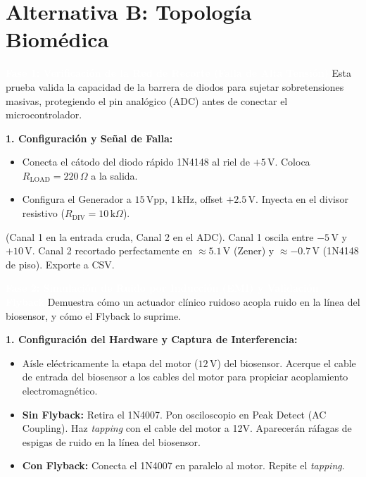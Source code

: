 \documentclass[11pt, a4paper]{article}
\newcommand{\phase}[1]{\vspace{0.4cm}\noindent\colorbox{ucbblue}{\textcolor{white}{\textbf{\large #1}}}\vspace{0.2cm}}
\newcommand{\subphase}[1]{\vspace{0.2cm}\noindent\textbf{\textcolor{ucbblue}{#1}}\vspace{0.1cm}}
\begin{document}
\newpage
\section*{\textcolor{ucborange}{Alternativa B: Topología Biomédica}}

\phase{Fase 1: Verificación de la Red de Recorte (Falla de Alta Tensión)}
Esta prueba valida la capacidad de la barrera de diodos para sujetar sobretensiones masivas, protegiendo el pin analógico (ADC) antes de conectar el microcontrolador.

\subphase{1. Configuración y Señal de Falla:}
\begin{itemize}[leftmargin=*]
    \item Conecta el cátodo del diodo rápido 1N4148 al riel de $+5\,\text{V}$. Coloca $R_{\text{LOAD}} = 220\,\Omega$ a la salida.
    \item Configura el Generador a $15\,\text{Vpp}$, $1\,\text{kHz}$, offset $+2.5\,\text{V}$. Inyecta en el divisor resistivo ($R_{\text{DIV}} = 10\,\text{k}\Omega$).
\end{itemize}

\begin{expected}
(Canal 1 en la entrada cruda, Canal 2 en el ADC). Canal 1 oscila entre $-5\,\text{V}$ y $+10\,\text{V}$. Canal 2 recortado perfectamente en $\approx 5.1\,\text{V}$ (Zener) y $\approx -0.7\,\text{V}$ (1N4148 de piso). Exporte a CSV.
\end{expected}

\phase{Fase 2: Simulación de Ruido por Inducción (EMI) y Validación Flyback}
Demuestra cómo un actuador clínico ruidoso acopla ruido en la línea del biosensor, y cómo el Flyback lo suprime.

\subphase{1. Configuración del Hardware y Captura de Interferencia:}
\begin{itemize}[leftmargin=*]
    \item Aísle eléctricamente la etapa del motor ($12\,\text{V}$) del biosensor. Acerque el cable de entrada del biosensor a los cables del motor para propiciar acoplamiento electromagnético.
    \item \textbf{Sin Flyback:} Retira el 1N4007. Pon osciloscopio en Peak Detect (AC Coupling). Haz \textit{tapping} con el cable del motor a 12V. Aparecerán ráfagas de espigas de ruido en la línea del biosensor.
    \item \textbf{Con Flyback:} Conecta el 1N4007 en paralelo al motor. Repite el \textit{tapping}.
\end{itemize}
\end{document}
